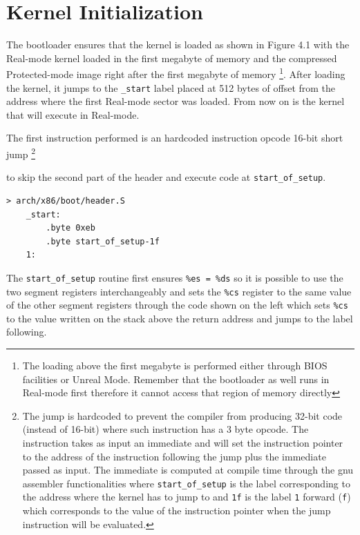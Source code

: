 \documentclass[twoside]{article}
\begin{document}
\section{Kernel Initialization}

The bootloader ensures that the kernel is loaded as shown in Figure 4.1 with the Real-mode kernel loaded in the first megabyte of memory and the compressed Protected-mode image right after the first megabyte of memory \footnote{The loading above the first megabyte is performed either through BIOS facilities or Unreal Mode. Remember that the bootloader as well runs in Real-mode first therefore it cannot access that region of memory directly}. After loading the kernel, it jumps to the
\texttt{_start} label placed at 512 bytes of offset from the address where the first Real-mode sector was loaded. From now on is the kernel that will execute in Real-mode.

The first instruction performed is an hardcoded instruction opcode 16-bit short jump \footnote{
The jump is hardcoded to prevent the compiler from producing 32-bit code (instead of 16-bit) where such instruction has a 3 byte opcode. The instruction takes as input an immediate and will set the instruction pointer to the address of the instruction following the jump plus the immediate passed as input. The immediate is computed at compile time through the gnu assembler functionalities where \texttt{start_of_setup} is the label corresponding to the address where the kernel has to jump to and \texttt{1f}
is the label \texttt{1} forward (\texttt{f}) which corresponds to the value of the instruction pointer when the jump instruction will be evaluated.}

to skip the second part of the header and execute code at \texttt{start_of_setup}.

\begin{verbatim}
> arch/x86/boot/header.S
    _start:
        .byte 0xeb
        .byte start_of_setup-1f
    1:
\end{verbatim}

The \texttt{start_of_setup} routine  first ensures \texttt{\%es = \%ds} so it is possible to use the two segment registers interchangeably and sets   the \texttt{\%cs} register to the same value of the other segment registers through the code shown on the left which sets \texttt{\%cs} to the value written on the stack above the return address and jumps to the label following. 
\end{document}
